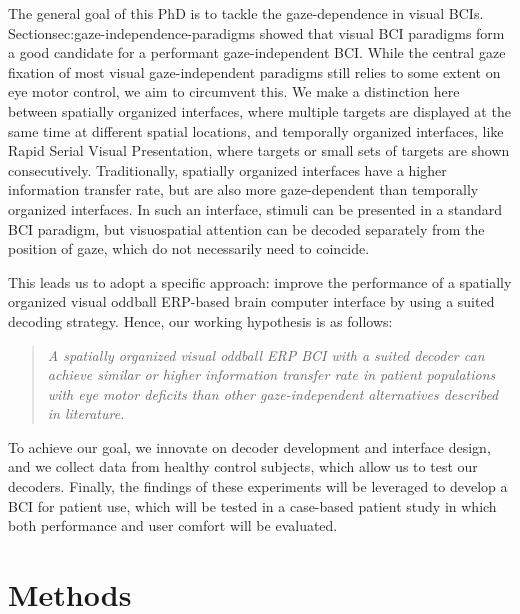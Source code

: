The general goal of this PhD is to tackle the gaze-dependence in visual BCIs.
Section{sec:gaze-independence-paradigms} showed that visual BCI paradigms form
a good candidate for a performant gaze-independent BCI.
While the central gaze fixation of most visual gaze-independent paradigms still
relies to some extent on eye motor control, we aim to circumvent this.
We make a distinction here between spatially organized interfaces, where
multiple targets are displayed at the same time at different spatial locations,
and temporally organized interfaces, like Rapid Serial Visual Presentation,
where targets or small sets of targets are shown consecutively.
Traditionally, spatially organized interfaces have a higher information transfer
rate, but are also more gaze-dependent than temporally organized interfaces.
In such an interface, stimuli can be presented in a standard BCI paradigm, but
visuospatial attention can be decoded separately from the position of gaze,
which do not necessarily need to coincide.

This leads us to adopt a specific approach: improve the performance of a
spatially organized visual oddball ERP-based brain
computer interface by using a suited decoding strategy.
Hence, our working hypothesis is as follows:
\begin{quote}
	\textit{A spatially organized visual oddball ERP BCI with a suited decoder
		can achieve similar or higher information transfer rate in patient
		populations with eye motor deficits than other
		gaze-independent alternatives described in literature.}
\end{quote}

To achieve our goal, we innovate on decoder development and interface design,
and we collect data from healthy control subjects, which allow us to test our decoders.
Finally, the findings of these experiments will be leveraged to develop a BCI
for patient use, which will be tested in a case-based patient study in which
both performance and user comfort will be evaluated.



\section{Methods}

